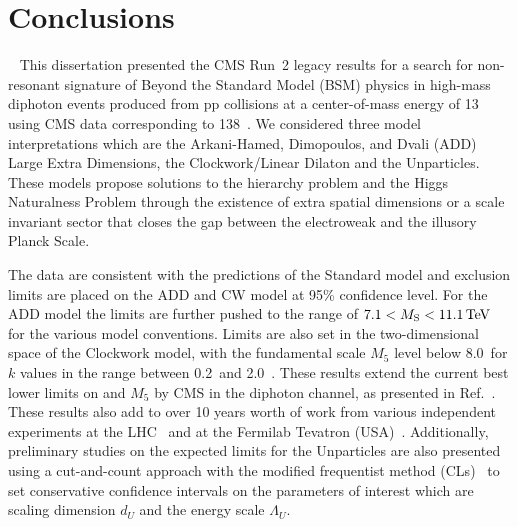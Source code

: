\chapter{Conclusions}~\label{ch:conclusion}
This dissertation presented the CMS Run~2 legacy results for a search for non-resonant signature of Beyond the Standard Model (BSM) physics in high-mass diphoton events produced from pp collisions at a center-of-mass energy of 13 \TeV using CMS data corresponding to 138~\fbinv. We considered three model interpretations which are the Arkani-Hamed, Dimopoulos, and Dvali (ADD) Large Extra Dimensions, the Clockwork/Linear Dilaton and the Unparticles. These models propose solutions to the hierarchy problem and the Higgs Naturalness Problem through the existence of extra spatial dimensions or a scale invariant sector that closes the gap between the electroweak and the illusory Planck Scale.

The data are consistent with the predictions of the Standard model and exclusion limits are placed on the ADD and CW model at 95\% confidence level. For the ADD model the limits are further pushed to the range of $7.1 < M_{\rm S} < 11.1\,\text{Te\hspace{-.08em}V}$ for the various model conventions. Limits are also set in the two-dimensional space of the Clockwork model, with the fundamental scale $M_5$ level below 8.0~\TeV for $k$ values in the range between 0.2~\GeV and 2.0~\TeV. These results extend the current best lower limits on \Ms and $M_5$ by CMS in the diphoton channel, as presented in Ref.~\cite{cmsdiphoton2016}. These results also add to over 10 years worth of work from various independent experiments at the LHC~\cite{Sirunyan:2018wnk,Aad:2021,Aaboud:2017yyg,Khachatryan:2016yec,Aaboud:2016tru,Khachatryan:2016hje} and at the Fermilab Tevatron (USA)~\cite{Aaltonen:2011xp,CDF:2002hrr,CDF:2010muc,CDF:2011weq,Abazov:2010xh,D0:2000cve,D0:2008hxb,D0:2005srl}. Additionally, preliminary studies on the expected limits for the Unparticles are also presented using a cut-and-count approach with the modified frequentist method (CLs)~\cite{Cowan:2010js} to set conservative confidence intervals on the parameters of interest which are scaling dimension $d_U$ and the energy scale $\Lambda_{U}$. 



